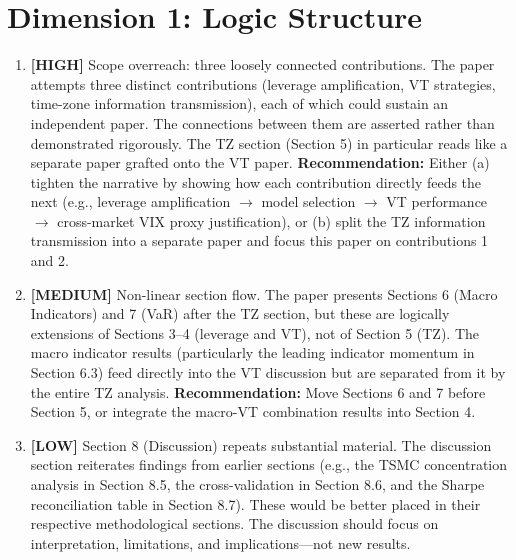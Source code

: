 \documentclass[12pt,a4paper]{article}
\newcommand{\HIGH}[1]{\textcolor{errorred}{\textbf{[HIGH]} #1}}
\newcommand{\MEDIUM}[1]{\textcolor{warncolor}{\textbf{[MEDIUM]} #1}}
\newcommand{\LOW}[1]{\textcolor{infocolor}{\textbf{[LOW]} #1}}
\begin{document}
\section{Dimension 1: Logic Structure}

\begin{enumerate}[leftmargin=2em]

\item \HIGH{Scope overreach: three loosely connected contributions.} The paper attempts three distinct contributions (leverage amplification, VT strategies, time-zone information transmission), each of which could sustain an independent paper. The connections between them are asserted rather than demonstrated rigorously. The TZ section (Section 5) in particular reads like a separate paper grafted onto the VT paper. \textbf{Recommendation:} Either (a) tighten the narrative by showing how each contribution directly feeds the next (e.g., leverage amplification $\to$ model selection $\to$ VT performance $\to$ cross-market VIX proxy justification), or (b) split the TZ information transmission into a separate paper and focus this paper on contributions 1 and 2.

\item \MEDIUM{Non-linear section flow.} The paper presents Sections 6 (Macro Indicators) and 7 (VaR) after the TZ section, but these are logically extensions of Sections 3--4 (leverage and VT), not of Section 5 (TZ). The macro indicator results (particularly the leading indicator momentum in Section 6.3) feed directly into the VT discussion but are separated from it by the entire TZ analysis. \textbf{Recommendation:} Move Sections 6 and 7 before Section 5, or integrate the macro-VT combination results into Section 4.

\item \LOW{Section 8 (Discussion) repeats substantial material.} The discussion section reiterates findings from earlier sections (e.g., the TSMC concentration analysis in Section 8.5, the cross-validation in Section 8.6, and the Sharpe reconciliation table in Section 8.7). These would be better placed in their respective methodological sections. The discussion should focus on interpretation, limitations, and implications---not new results.

\end{enumerate}

\end{document}
